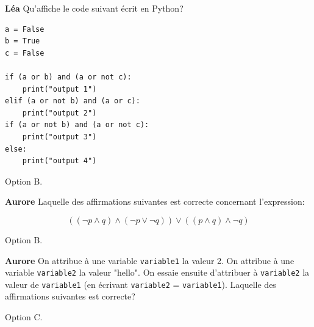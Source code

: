 \begin{Exercice}[10 minutes]\textbf{Léa}
Qu'affiche le code suivant écrit en Python?
\begin{lstlisting}[style=pythonstyle]
a = False
b = True
c = False

if (a or b) and (a or not c):
    print("output 1")
elif (a or not b) and (a or c):
    print("output 2")
if (a or not b) and (a or not c):
    print("output 3")
else:
    print("output 4")
\end{lstlisting}

\begin{solution}
Option B. 
\end{solution}
\end{Exercice}

\begin{Exercice}[10 minutes]\textbf{Aurore}
Laquelle des affirmations suivantes est correcte concernant l'expression:

\begin{equation*}
((\neg p \wedge q) \wedge (\neg p \vee \neg q)) \vee ((p \wedge q) \wedge \neg q)
\end{equation*}

\begin{solution}
Option B. 
\end{solution}
\end{Exercice}

\begin{Exercice}[10 minutes]\textbf{Aurore}
On attribue à une variable \texttt{variable1} la valeur 2. On attribue à une variable \texttt{variable2} la valeur "hello". On essaie ensuite d'attribuer à \texttt{variable2} la valeur de \texttt{variable1} (en écrivant \texttt{variable2} = \texttt{variable1}). Laquelle des affirmations suivantes est correcte?


\begin{solution}
Option C. 
\end{solution}
\end{Exercice}

